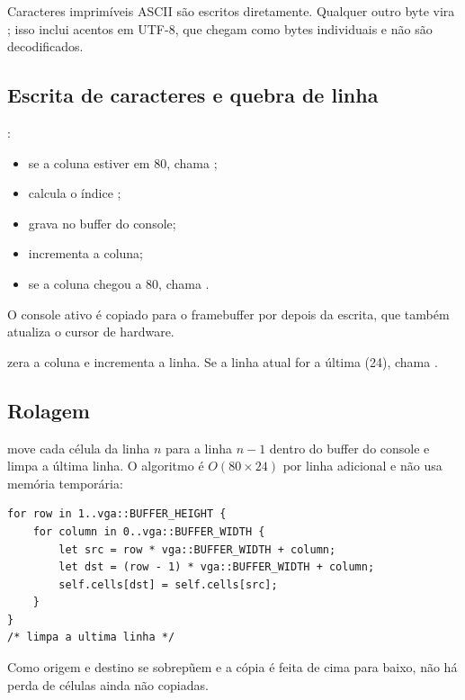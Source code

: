 Caracteres imprim\'iveis ASCII s\~ao escritos diretamente. Qualquer outro
byte vira ; isso inclui acentos em UTF-8, que chegam como bytes
individuais e n\~ao s\~ao decodificados.

\subsection{Escrita de caracteres e quebra de linha}

:

\begin{itemize}
  \item se a coluna estiver em 80, chama ;
  \item calcula o \'indice ;
  \item grava  no buffer do console;
  \item incrementa a coluna;
  \item se a coluna chegou a 80, chama .
\end{itemize}

O console ativo \'e copiado para o framebuffer por  depois
da escrita, que tamb\'em atualiza o cursor de hardware.

 zera a coluna e incrementa a linha. Se a linha atual for a
\'ultima (24), chama .

\subsection{Rolagem}

 move cada c\'elula da linha $n$ para a linha $n-1$ dentro do
buffer do console e limpa a \'ultima linha. O algoritmo \'e
$O(80 \times 24)$ por linha adicional e n\~ao usa mem\'oria tempor\'aria:

\begin{lstlisting}[caption={N\'ucleo da rolagem.},label={lst:scroll}]
for row in 1..vga::BUFFER_HEIGHT {
    for column in 0..vga::BUFFER_WIDTH {
        let src = row * vga::BUFFER_WIDTH + column;
        let dst = (row - 1) * vga::BUFFER_WIDTH + column;
        self.cells[dst] = self.cells[src];
    }
}
/* limpa a ultima linha */
\end{lstlisting}

Como origem e destino se sobrep\~uem e a c\'opia \'e feita de cima para baixo,
n\~ao h\'a perda de c\'elulas ainda n\~ao copiadas.

